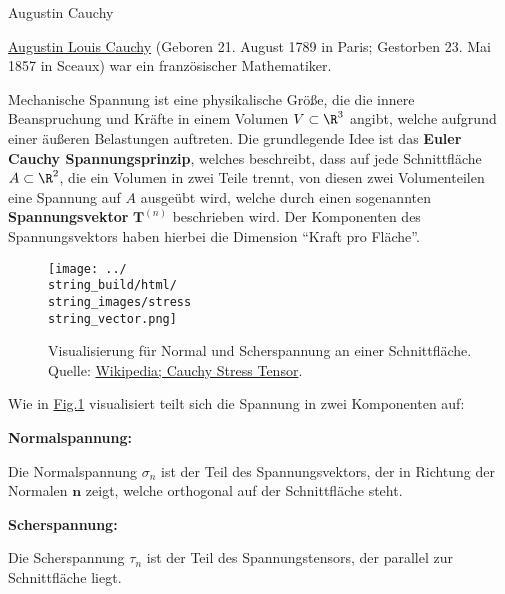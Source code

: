 \documentclass[letterpaper,10pt,english]{jupyterBook}
\begin{document}
\begin{emphBox}{Augustin Cauchy}{}

\par
\href{https://de.wikipedia.org/wiki/Augustin-Louis\_Cauchy}{Augustin Louis Cauchy} (Geboren 21. August 1789 in Paris; Gestorben 23. Mai 1857 in Sceaux) war ein französischer Mathematiker.
\end{emphBox}

\par
Mechanische Spannung ist eine physikalische Größe, die die innere Beanspruchung und Kräfte in einem Volumen \(V\subset\R^3\) angibt, welche aufgrund einer äußeren Belastungen auftreten.
Die grundlegende Idee ist das \textbf{Euler Cauchy Spannungsprinzip}, welches beschreibt, dass auf jede Schnittfläche \(A\subset\R^2\), die ein Volumen in zwei Teile trennt, von diesen zwei Volumenteilen eine Spannung auf \(A\) ausgeübt wird, welche durch einen sogenannten \textbf{Spannungsvektor} \(\mathbf{T}^{(n)}\) beschrieben wird.
Der Komponenten des Spannungsvektors haben hierbei die Dimension “Kraft pro Fläche”.

\begin{figure}[htbp]
\centering


\noindent\texttt{[image: ../\\string\_build/html/\\string\_images/stress\\string\_vector.png]}
\caption{Visualisierung für Normal  und Scherspannung an einer Schnittfläche. Quelle: \href{https://en.wikipedia.org/wiki/Cauchy\_stress\_tensor}{Wikipedia; Cauchy Stress Tensor}.}\label{\detokenize{vektoranalysis/tensor:fig-stress}}\end{figure}

\par
Wie in \hyperref[\detokenize{vektoranalysis/tensor:fig-stress}]{Fig.\@ \ref{\detokenize{vektoranalysis/tensor:fig-stress}}} visualisiert teilt sich die Spannung in zwei Komponenten auf:

\par
\textbf{Normalspannung:}

\par
Die Normalspannung \(\sigma_n\) ist der Teil des Spannungsvektors, der in Richtung der Normalen \(\mathbf{n}\) zeigt, welche orthogonal auf der Schnittfläche steht.

\par
\textbf{Scherspannung:}

\par
Die Scherspannung \(\tau_n\) ist der Teil des Spannungstensors, der parallel zur Schnittfläche liegt.
\end{document}
